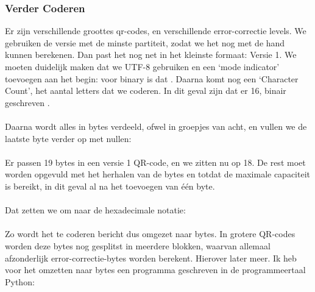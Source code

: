 \documentclass{article}
\begin{document}
\subsubsection{Verder Coderen}
Er zijn verschillende groottes qr-codes, en verschillende error-correctie levels. We gebruiken de versie met de minste partiteit, zodat we het nog met de hand kunnen berekenen. Dan past het nog net in het kleinste formaat: Versie 1.
We moeten duidelijk maken dat we UTF-8 gebruiken en een ‘mode indicator’ toevoegen aan het begin: voor binary is dat . Daarna komt nog een ‘Character Count’, het aantal letters dat we coderen. In dit geval zijn dat er 16, binair geschreven .\\\\
Daarna wordt alles in bytes verdeeld, ofwel in groepjes van acht, en vullen we de laatste byte verder op met nullen:\\\\
Er passen 19 bytes in een versie 1 QR-code, en we zitten nu op 18. De rest moet worden opgevuld met het herhalen van de bytes  en   totdat de maximale capaciteit is bereikt, in dit geval al na het toevoegen van één byte.\\\\
Dat zetten we om naar de hexadecimale notatie:\\\\
Zo wordt het te coderen bericht dus omgezet naar bytes. In grotere QR-codes worden deze bytes nog gesplitst in meerdere blokken, waarvan allemaal afzonderlijk error-correctie-bytes worden berekent. Hierover later meer.
Ik heb voor het omzetten naar bytes een programma geschreven in de programmeertaal Python:
\end{document}
